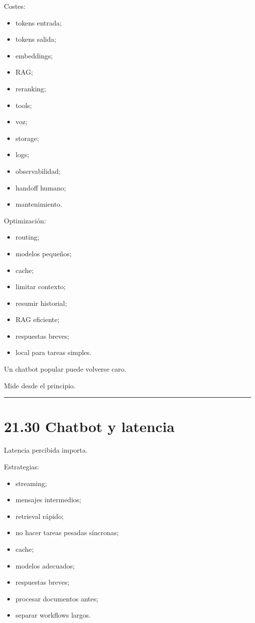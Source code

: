 Costes:

\begin{itemize}
\tightlist
\item
  tokens entrada;
\item
  tokens salida;
\item
  embeddings;
\item
  RAG;
\item
  reranking;
\item
  tools;
\item
  voz;
\item
  storage;
\item
  logs;
\item
  observabilidad;
\item
  handoff humano;
\item
  mantenimiento.
\end{itemize}

Optimización:

\begin{itemize}
\tightlist
\item
  routing;
\item
  modelos pequeños;
\item
  cache;
\item
  limitar contexto;
\item
  resumir historial;
\item
  RAG eficiente;
\item
  respuestas breves;
\item
  local para tareas simples.
\end{itemize}

Un chatbot popular puede volverse caro.

Mide desde el principio.

\begin{center}\rule{0.5\linewidth}{0.5pt}\end{center}

\section{21.30 Chatbot y latencia}\label{chatbot-y-latencia}

Latencia percibida importa.

Estrategias:

\begin{itemize}
\tightlist
\item
  streaming;
\item
  mensajes intermedios;
\item
  retrieval rápido;
\item
  no hacer tareas pesadas síncronas;
\item
  cache;
\item
  modelos adecuados;
\item
  respuestas breves;
\item
  procesar documentos antes;
\item
  separar workflows largos.
\end{itemize}

